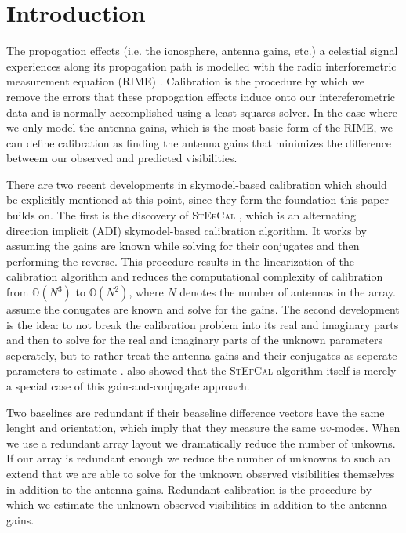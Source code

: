 \documentclass[useAMS,usenatbib]{mn2e}
\begin{document}
\section{Introduction}
The propogation effects (i.e. the ionosphere, antenna gains, etc.) a celestial signal experiences along its propogation path is modelled with the radio interforemetric measurement equation (RIME) \citep{ME1,RRIME1}.
Calibration is the procedure by which we remove the errors that these propogation effects induce onto our intereferometric data and is normally accomplished using a 
least-squares solver. In the case where we only model the antenna gains, which is the most basic form of the RIME, we can define calibration as finding the antenna gains that minimizes the difference betweem our observed and predicted visibilities. 

There are two recent developments in skymodel-based calibration which should be explicitly mentioned at this point, since they form the foundation this paper builds on. The first is the discovery of \textsc{StEfCal} \citep{Mitchell:MWA-cal,Salvini2014}, which 
is an alternating direction implicit (ADI) skymodel-based calibration algorithm. It works by assuming the gains are known while solving for their conjugates and then performing the reverse. 
This procedure results in the linearization of the calibration algorithm and reduces the computational complexity of calibration from $\mathbb{O}(N^3)$ to $\mathbb{O}(N^2)$, where $N$ denotes the number of antennas in the array. 
assume the conugates are known and solve for the gains. The second development is the idea: to not break the calibration problem 
into its real and imaginary parts and then to solve for the real and imaginary parts of the unknown parameters seperately, but to rather treat the antenna gains and their 
conjugates as seperate parameters to estimate \citep{Smirnov2015}. \citet{Smirnov2015} also showed that the \textsc{StEfCal} algorithm itself is merely a special case of this
gain-and-conjugate approach. 

Two baselines are redundant if their beaseline difference vectors have the same lenght and orientation, which imply that they measure the same $uv$-modes. When we use a redundant array layout we dramatically 
reduce the number of unkowns. If our array is redundant enough we reduce the number of unknowns to such an extend that we are able to solve for the unknown 
observed visibilities themselves in addition to the antenna gains. Redundant calibration is the procedure by which we estimate the unknown observed visibilities in addition
to the antenna gains.
\end{document}
